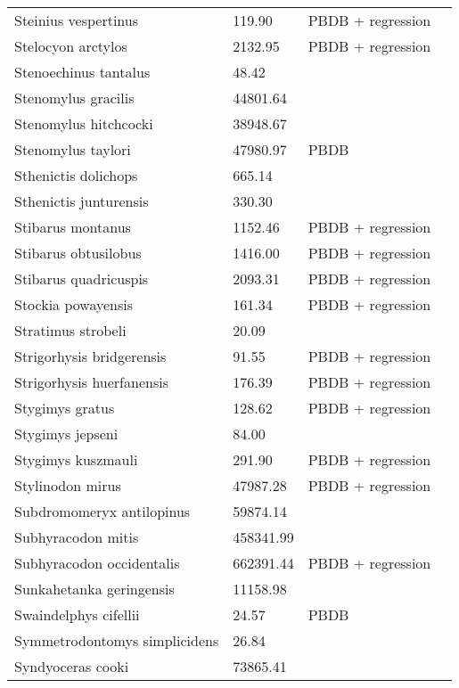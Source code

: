 \documentclass{article}
\begin{document}
\begin{center}
\begin{longtable}{p{} p{} p{} p{}}
    Steinius vespertinus & 119.90 & PBDB + regression &  \\ 
    Stelocyon arctylos & 2132.95 & PBDB + regression &  \\ 
    Stenoechinus tantalus & 48.42 & \cite{Tomiya2013} &  \\ 
    Stenomylus gracilis & 44801.64 & \cite{Tomiya2013} &  \\ 
    Stenomylus hitchcocki & 38948.67 & \cite{Tomiya2013} &  \\ 
    Stenomylus taylori & 47980.97 & PBDB &  \\ 
    Sthenictis dolichops & 665.14 & \cite{Tomiya2013} &  \\ 
    Sthenictis junturensis & 330.30 & \cite{Tomiya2013} &  \\ 
    Stibarus montanus & 1152.46 & PBDB + regression &  \\ 
    Stibarus obtusilobus & 1416.00 & PBDB + regression &  \\ 
    Stibarus quadricuspis & 2093.31 & PBDB + regression &  \\ 
    Stockia powayensis & 161.34 & PBDB + regression &  \\ 
    Stratimus strobeli & 20.09 & \cite{Tomiya2013} &  \\ 
    Strigorhysis bridgerensis & 91.55 & PBDB + regression &  \\ 
    Strigorhysis huerfanensis & 176.39 & PBDB + regression &  \\ 
    Stygimys gratus & 128.62 & PBDB + regression &  \\ 
    Stygimys jepseni & 84.00 & \cite{Wilson2012} &  \\ 
    Stygimys kuszmauli & 291.90 & PBDB + regression &  \\ 
    Stylinodon mirus & 47987.28 & PBDB + regression &  \\ 
    Subdromomeryx antilopinus & 59874.14 & \cite{Tomiya2013} &  \\ 
    Subhyracodon mitis & 458341.99 & \cite{Scott1940} &  \\ 
    Subhyracodon occidentalis & 662391.44 & PBDB + regression &  \\ 
    Sunkahetanka geringensis & 11158.98 & \cite{Tomiya2013} &  \\ 
    Swaindelphys cifellii & 24.57 & PBDB &  \\ 
    Symmetrodontomys simplicidens & 26.84 & \cite{Tomiya2013} &  \\ 
    Syndyoceras cooki & 73865.41 & \cite{Tomiya2013} &  \\ 

\end{longtable}
\end{center}
\end{document}
